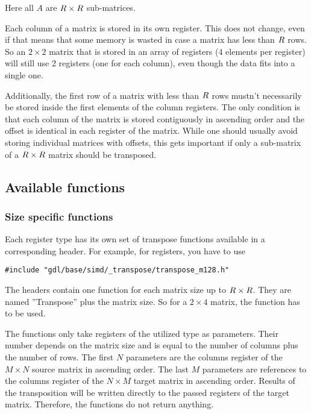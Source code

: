 \noindent Here all $A$ are $R \times R$ sub-matrices.


Each column of a matrix is stored in its own register.
This does not change, even if that means that some memory is wasted in case a matrix has less than $R$ rows.
So an $2 \times 2$ matrix that is stored in an array of  registers (4 elements per register) will still use 2 registers (one for each column), even though the data fits into a single one.

Additionally, the first row of a matrix with less than $R$ rows mustn't necessarily be stored inside the first elements of the column registers. 
The only condition is that each column of the matrix is stored contiguously in ascending order and the offset is identical in each register of the matrix.
While one should usually avoid storing individual matrices with offsets, this gets important if only a sub-matrix of a $R \times R$ matrix should be transposed.
 

\subsection{Available functions}

\subsubsection{Size specific functions}
\label{sec:size_specific_transpose_function}


Each register type has its own set of transpose functions available in a corresponding header.
For example, for  registers, you have to use
\begin{verbatim}
#include "gdl/base/simd/_transpose/transpose_m128.h"
\end{verbatim}

The headers contain one function for each matrix size up to $R \times R$.
They are named ''Transpose'' plus the matrix size.
So for a $2 \times 4$ matrix, the function  has to be used.

The functions only take registers of the utilized type as parameters.
Their number depends on the matrix size and is equal to the number of columns plus the number of rows.
The first $N$ parameters are the columns register of the $M \times N$ source matrix in ascending order.
The last $M$ parameters are references to the columns register of the $N \times M$ target matrix in ascending order.
Results of the transposition will be written directly to the passed registers of the target matrix.
Therefore, the functions do not return anything.

